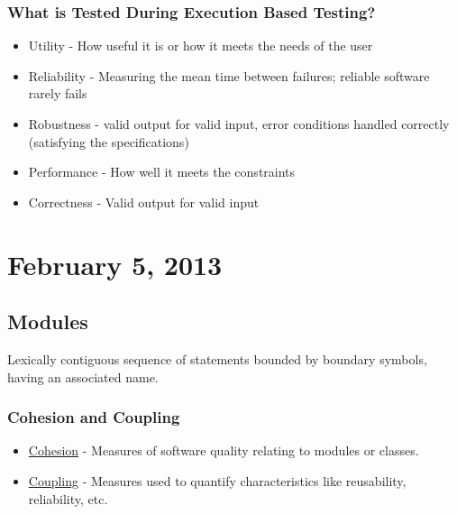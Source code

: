 \documentclass{report}
\begin{document}
			\subsection{What is Tested During Execution Based Testing?}
				\begin{itemize}
					\item Utility - How useful it is or how it meets the needs of the user
					\item Reliability - Measuring the mean time between failures; reliable software rarely fails
					\item Robustness - valid output for valid input, error conditions handled correctly (satisfying the specifications)
					\item Performance - How well it meets the constraints
					\item Correctness - Valid output for valid input
				\end{itemize}
	\chapter{February 5, 2013}
		\section{Modules}
			Lexically contiguous sequence of statements bounded by boundary symbols, having an associated name.
			\subsection{Cohesion and Coupling}
				\begin{itemize}
					\item \underline{Cohesion} - Measures of software quality relating to modules or classes.
					\item \underline{Coupling} - Measures used to quantify characteristics like reusability, reliability, etc.
				\end{itemize}
\end{document}
